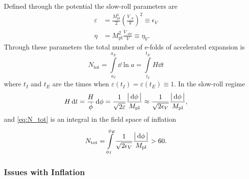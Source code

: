 %
Defined through the potential the slow-roll parameters are
%
\begin{subequations}
	\begin{align}
		\varepsilon & = \frac{M_{\text{pl}}^{2}}{2} {\left( \frac{V_{,\phi}}{V} \right)}^{2} \equiv \epsilon_{V} \\
		\eta        & = M_{\text{pl}}^{2} \frac{V_{,\phi\phi}}{V} \equiv \eta_{V}.
	\end{align}
\end{subequations}
%
Through these parameters the total number of e-folds of accelerated expansion is
%
\begin{equation}\label{eq:N_tot}
	N_{\text{tot}}
	= \int\limits_{a_{I}}^{a_{E}} \dd{\ln{a}}
	= \int\limits_{t_{I}}^{t_{E}} H \dd{t}
\end{equation}
%
where \(t_{I}\) and \(t_{E}\) are the times when \(\varepsilon(t_{I}) = \varepsilon(t_{E}) \equiv 1\).
In the slow-roll regime
%
\begin{equation}
	H \dd{t}
	= \frac{H}{\dot{\phi}} \dd{\phi}
	= \frac{1}{\sqrt{2\varepsilon}} \frac{\big\lvert\dd{\phi}\big\rvert}{M_{\text{pl}}}
	\approx \frac{1}{\sqrt{2\epsilon_{V}}} \frac{\big\lvert\dd{\phi}\big\rvert}{M_{\text{pl}}},
\end{equation}
%
and \cref{eq:N_tot} is an integral in the field space of inflation
%
\begin{equation}
	N_{\text{tot}}
	= \int\limits_{\phi_{I}}^{\phi_{E}}  \frac{1}{\sqrt{2\epsilon_{V}}} \frac{\big\lvert\dd{\phi}\big\rvert}{M_{\text{pl}}}
	> 60.
\end{equation}

\subsubsection{Issues with Inflation}

